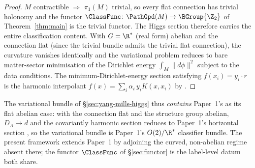 \begin{proof}
$M$ contractible $\Rightarrow$ $\pi_1(M)$ trivial, so every flat
connection has trivial holonomy and the functor
$\ClassFunc\colon\PathGpd(M)\to\BGroup{\Z_2}$ of
Theorem~\ref{thm:main} is the trivial functor. The Higgs section
therefore carries the entire classification content. With $G=\R^*$
(real form) abelian and the connection flat (since the trivial
bundle admits the trivial flat connection), the curvature vanishes
identically and the variational
problem reduces to bare matter-sector minimisation of the Dirichlet
energy $\int_M\|d\phi\|^2$ subject to the data conditions. The
minimum-Dirichlet-energy section satisfying
$f(x_i)=y_i\cdot r$ is the harmonic interpolant
$f(x)=\sum_i\alpha_i\,y_i K(x,x_i)$ by
\cite[Theorem~13.3]{Vasii2026Paper1}.
\end{proof}

The variational bundle of \S\ref{sec:yang-mills-higgs} thus
\emph{contains} Paper~1's as its flat abelian case: with the
connection flat and the structure group abelian, $D_A\to d$ and the
covariantly harmonic section reduces to Paper~1's horizontal section
\cite[Remark~5.3]{Vasii2026Paper1}, so the variational bundle is
Paper~1's $O(2)/\R^*$ classifier bundle. The present framework
extends Paper~1 by adjoining the curved, non-abelian regime absent
there; the functor $\ClassFunc$ of \S\ref{sec:functor} is the
label-level datum both share.


